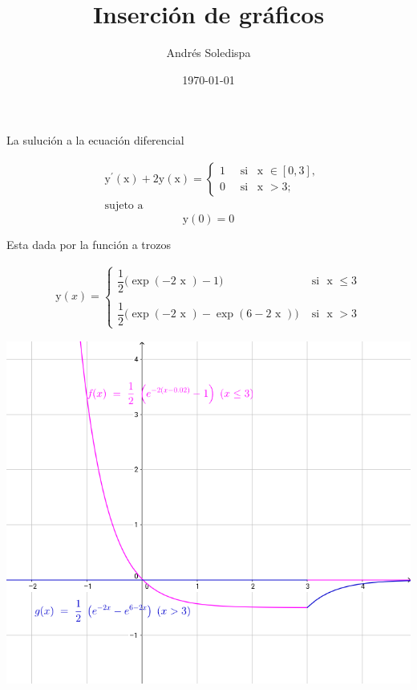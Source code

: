 \documentclass[a4paper,12pt]{article}
\title{Inserción de gráficos}
\author{Andrés Soledispa}
\date{\today}
\begin{document}
\maketitle
La suluci\'{o}n a la ecuaci\'{o}n diferencial

\begin{align*}
 &\text{y}^{'}(\text{x})+2\text{y}(\text{x})=
 \begin{cases}
 1 \quad \text{ si } \, \text{ x }\in[0,3],\\
 0 \quad \text{ si } \, \text{ x } > 3;
 \end{cases}  \\
 &\text{sujeto a}
\end{align*}
\[
\text{y}(0)=0
\]

Esta dada por la función a trozos 

\begin{align*}
 \text{y}(x)=
 \begin{cases}
 \dfrac{1}{2} \big(\exp(-2\text{ x }) -1) \quad &\text{ si } \text{ x } \leq 3\\
 \\
\dfrac{1}{2} \big(\exp(-2\text{ x })- \exp(6-2\text{ x }) )  &\text{ si } \text{ x } > 3
\end{cases} 
\end{align*}
\begin{center}
 \includegraphics[scale=0.5]{figura1}
\end{center} 
 
\end{document}

